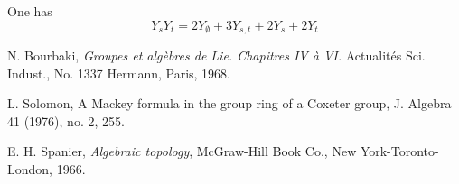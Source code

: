 \documentclass[11pt,a4paper]{amsart}
\theoremstyle{contraction}
\begin{document}
One has
$$Y_sY_t=2Y_\emptyset+3Y_{s,t}+2Y_s+2Y_t$$
\begin{thebibliography}{}
N. Bourbaki, {\sl
Groupes et alg\`ebres de Lie. Chapitres IV \`a VI.}
Actualit\'es Sci. Indust., No. 1337
Hermann, Paris, 1968.

L. Solomon,  A Mackey formula in the group ring of a Coxeter group,
J. Algebra 41 (1976), no. 2, 255.

E. H. 
Spanier, {\sl Algebraic topology},
McGraw-Hill Book Co., New York-Toronto-London, 1966.

\end{thebibliography}
\end{document}

